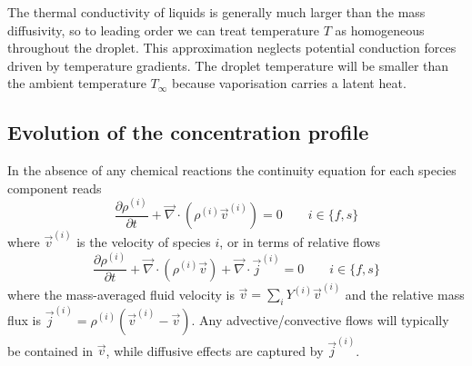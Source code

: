 \documentclass[11pt,twoside]{report}
\begin{document}
The thermal conductivity of liquids is generally much larger than the mass diffusivity, so to leading order we can treat temperature $T$ as homogeneous throughout the droplet.
This approximation neglects potential conduction forces driven by temperature gradients.
The droplet temperature will be smaller than the ambient temperature $T_\infty$ because vaporisation carries a latent heat.

\subsection{Evolution of the concentration profile}

In the absence of any chemical reactions the continuity equation for each species component reads
\begin{equation}\label{eq:species-continuity}
  \frac{\partial \rho^{(i)}}{\partial t} +
  \vec{\nabla} \cdot (\rho^{(i)} \vec{v}^{(i)}) = 0
  \qquad i \in \{f,s\}
\end{equation}
where $\vec{v}^{(i)}$ is the velocity of species $i$, or in terms of relative flows
\begin{equation}\label{eq:species-continuity-relative}
  \frac{\partial \rho^{(i)}}{\partial t} +
  \vec{\nabla} \cdot (\rho^{(i)} \vec{v}) +
  \vec{\nabla} \cdot \vec{j}^{(i)} = 0
  \qquad i \in \{f,s\}
\end{equation}
where the mass-averaged fluid velocity is $\vec{v} = \sum_i Y^{(i)} \vec{v}^{(i)}$ and the relative mass flux is $\vec{j}^{(i)} = \rho^{(i)} (\vec{v}^{(i)} - \vec{v})$.
Any advective/convective flows will typically be contained in $\vec{v}$, while diffusive effects are captured by $\vec{j}^{(i)}$.
\end{document}
